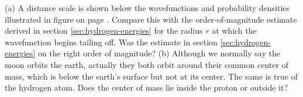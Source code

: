 (a) A distance scale is shown below the wavefunctions and
probability densities illustrated in figure
 on 
page \pageref{fig:hydrogen-three-states}. Compare
this with the order-of-magnitude estimate derived in section
\ref{sec:hydrogen-energies} for the radius $r$ at which the wavefunction begins
tailing off. Was the estimate in section \ref{sec:hydrogen-energies} on the right
order of magnitude?\hwendpart
 (b) Although we normally say the moon
orbits the earth, actually they both orbit around their
common center of mass, which is below the earth's surface
but not at its center. The same is true of the hydrogen
atom. Does the center of mass lie inside the proton or outside it?
